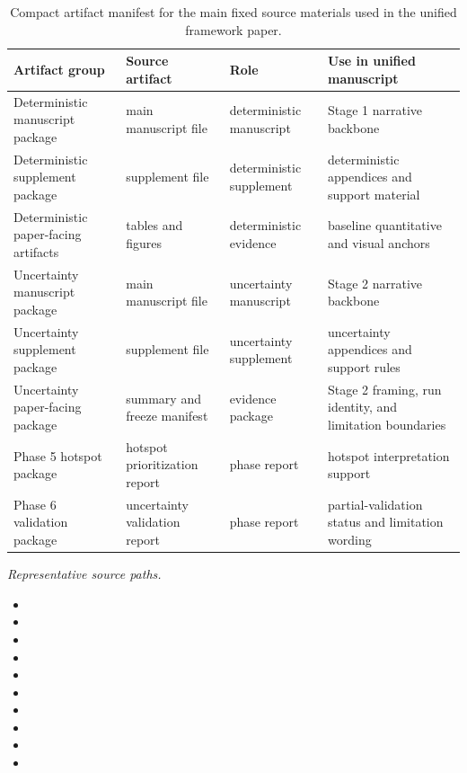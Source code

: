 \begin{table}[H]
\centering
\footnotesize
\setlength{\tabcolsep}{4pt}
\renewcommand{\arraystretch}{1.15}
\caption{Compact artifact manifest for the main fixed source materials used in the unified framework paper.}
\label{tab:s9-file-manifest}
\begin{tabularx}{\textwidth}{L{3.45cm} L{3.3cm} L{3.0cm} Y}
\toprule
Artifact group & Source artifact & Role & Use in unified manuscript \\
\midrule
Deterministic manuscript package & main manuscript file & deterministic manuscript & Stage 1 narrative backbone \\
Deterministic supplement package & supplement file & deterministic supplement & deterministic appendices and support material \\
Deterministic paper-facing artifacts & tables and figures & deterministic evidence & baseline quantitative and visual anchors \\
Uncertainty manuscript package & main manuscript file & uncertainty manuscript & Stage 2 narrative backbone \\
Uncertainty supplement package & supplement file & uncertainty supplement & uncertainty appendices and support rules \\
Uncertainty paper-facing package & summary and freeze manifest & evidence package & Stage 2 framing, run identity, and limitation boundaries \\
Phase 5 hotspot package & hotspot prioritization report & phase report & hotspot interpretation support \\
Phase 6 validation package & uncertainty validation report & phase report & partial-validation status and limitation wording \\
\bottomrule
\end{tabularx}
\end{table}

\noindent\footnotesize\textit{Representative source paths.}
\begin{itemize}\setlength{\itemsep}{0pt}\setlength{\topsep}{0pt}
\item {}
\item {}
\item {}
\item {}
\item {}
\item {}
\item {}
\item {}
\item {}
\item {}
\end{itemize}
\normalsize
